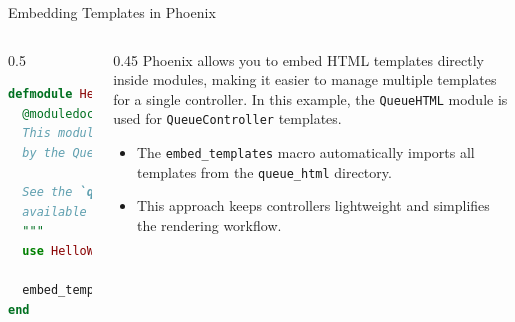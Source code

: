\documentclass[aspectratio=169, table]{beamer}
\begin{document}
\begin{frame}[fragile]{Embedding Templates in Phoenix}
\vspace{20pt}

\begin{columns}
  \begin{column}[T]{0.5\textwidth}
\begin{lstlisting}[language=Elixir, basicstyle=\ttfamily\footnotesize]
defmodule HelloWeb.QueueHTML do
  @moduledoc """
  This module contains the pages rendered
  by the QueueController.

  See the `queue_html` directory for all
  available templates.
  """
  use HelloWeb, :html

  embed_templates "queue_html/*"
end
\end{lstlisting}
  \end{column}

  \begin{column}[T]{0.45\textwidth}
    Phoenix allows you to embed HTML templates directly inside modules,  
    making it easier to manage multiple templates for a single controller.  
    In this example, the \texttt{QueueHTML} module is used for  
    \texttt{QueueController} templates.

    \begin{itemize}
      \item The \texttt{embed\_templates} macro automatically imports  
      all templates from the \texttt{queue\_html} directory.
      \item This approach keeps controllers lightweight and  
      simplifies the rendering workflow.
    \end{itemize}
  \end{column}
\end{columns}
\end{frame}
\end{document}
